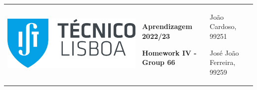 \documentclass[11pt,a4paper]{article}
\begin{document}
\normalsize

\pagebreak
\color{darkgray}
\hspace{-8.25mm}
\renewcommand\tabularxcolumn[1]{m{#1}}
\begin{tabularx}{1.09\textwidth} {>{\raggedright\arraybackslash}X >{\centering\arraybackslash}X >{\raggedleft\arraybackslash}X}
  \includegraphics[scale=0.2]{tecnico.pdf}                           &
  \textbf{Aprendizagem 2022/23} \par \textbf{Homework IV - Group 66} &
  João Cardoso, 99251 \par José João Ferreira, 99259
\end{tabularx}
\renewcommand\tabularxcolumn[1]{p{#1}}
\color{black}

\begin{center}
  \textbf{}
\end{center}
\end{document}
